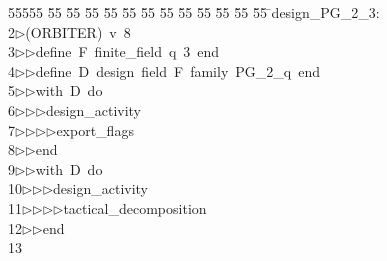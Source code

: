%
%
\begin{tabbing}
55555 \= 55 \= 55 \= 55 \= 55 \= 55 \= 55 \= 55 \= 55 \= 55 \= 55 \= 55 \= 55 \= \>design\_PG\_2\_3:\\[0pt]
2\>$\triangleright$\>(ORBITER)\ v\ 8\ \\[0pt]
3\>$\triangleright$\>$\triangleright$\>define\ F\ finite\_field\ q\ 3\ end\ \\[0pt]
4\>$\triangleright$\>$\triangleright$\>define\ D\ design\ field\ F\ family\ PG\_2\_q\ end\ \\[0pt]
5\>$\triangleright$\>$\triangleright$\>with\ D\ do\ \\[0pt]
6\>$\triangleright$\>$\triangleright$\>$\triangleright$\>design\_activity\ \\[0pt]
7\>$\triangleright$\>$\triangleright$\>$\triangleright$\>$\triangleright$\>export\_flags\ \\[0pt]
8\>$\triangleright$\>$\triangleright$\>end\ \\[0pt]
9\>$\triangleright$\>$\triangleright$\>with\ D\ do\ \\[0pt]
10\>$\triangleright$\>$\triangleright$\>$\triangleright$\>design\_activity\ \\[0pt]
11\>$\triangleright$\>$\triangleright$\>$\triangleright$\>$\triangleright$\>tactical\_decomposition\ \\[0pt]
12\>$\triangleright$\>$\triangleright$\>end\\[0pt]
13\>\end{tabbing}
